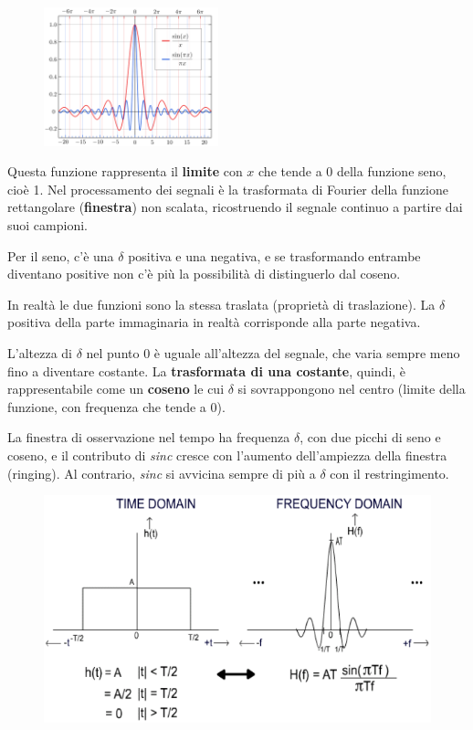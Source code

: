 \begin{figure}
	\vspace{-15pt}
	\includegraphics[width=0.45\textwidth]{Lezioni/Immagini/sinc.png}
	\vspace{-30pt}
\end{figure}

Questa funzione rappresenta il \textbf{limite} con $x$ che tende a 0 della funzione seno, cioè 1. Nel processamento dei segnali è la trasformata di Fourier della funzione rettangolare (\textbf{finestra}) non scalata, ricostruendo il segnale continuo a partire dai suoi campioni.

Per il seno, c'è una $\delta$ positiva e una negativa, e se trasformando entrambe diventano positive non c'è più la possibilità di distinguerlo dal coseno. 

In realtà le due funzioni sono la stessa traslata (proprietà di traslazione). La $\delta$ positiva della parte immaginaria in realtà corrisponde alla parte negativa.

L'altezza di $\delta$ nel punto 0 è uguale all'altezza del segnale, che varia sempre meno fino a diventare costante. La \textbf{trasformata di una costante}, quindi, è rappresentabile come un \textbf{coseno} le cui $\delta$ si sovrappongono nel centro (limite della funzione, con frequenza che tende a 0).

La finestra di osservazione nel tempo ha frequenza $\delta$, con due picchi di seno e coseno, e il contributo di \textit{sinc} cresce con l'aumento dell'ampiezza della finestra (ringing). Al contrario, \textit{sinc} si avvicina sempre di più a $\delta$ con il restringimento.

\begin{figure}[h]
	\centering
	\includegraphics[scale=0.6]{Lezioni/Immagini/finestra_sinc}
\end{figure}
